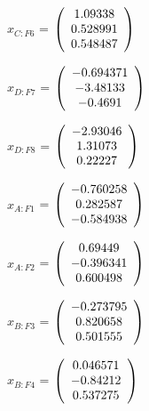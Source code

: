 \begin{description}
$x_{C:F6}$ = $\left( \begin{array} {ccc}    1.09338 \\   0.528991 \\   0.548487
\end{array} \right)\\ \\$

$x_{D:F7}$ = $\left( \begin{array} {ccc}  -0.694371 \\   -3.48133 \\    -0.4691
\end{array} \right)\\ \\$

$x_{D:F8}$ = $\left( \begin{array} {ccc}   -2.93046 \\    1.31073 \\    0.22227
\end{array} \right)\\ \\$

$\hat{x}_{A:F1}$ = $\left( \begin{array} {ccc}  -0.760258 \\   0.282587 \\  -0.584938
\end{array} \right)\\ \\$

$\hat{x}_{A:F2}$ = $\left( \begin{array} {ccc}    0.69449 \\  -0.396341 \\   0.600498
\end{array} \right)\\ \\$

$\hat{x}_{B:F3}$ = $\left( \begin{array} {ccc}  -0.273795 \\   0.820658 \\   0.501555
\end{array} \right)\\ \\$

$\hat{x}_{B:F4}$ = $\left( \begin{array} {ccc}   0.046571 \\   -0.84212 \\   0.537275
\end{array} \right)\\ \\$


\end{description}

